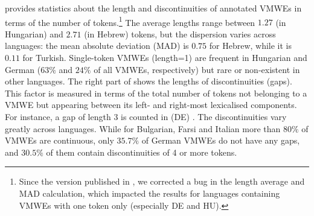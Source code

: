 \documentclass[output=paper,modfonts]{langscibook}
\begin{document}
 provides statistics about the length and discontinuities of annotated VMWEs in terms of the number of tokens.\footnote{Since the version published in \citet{MWEWorkshop}, we corrected a bug in the length average and MAD calculation, which impacted the results for languages containing VMWEs with one token only (especially DE and HU).} %
The average lengths range between 
$1.27$ (in Hungarian) and $2.71$ (in Hebrew) tokens, 
but the dispersion varies across languages: the mean absolute deviation (MAD) is $0.75$ for Hebrew, while it is $0.11$ for Turkish. Single-token VMWEs (length=1) are frequent in Hungarian and German ($63\%$ and $24\%$ %
of all VMWEs, respectively) but rare or non-existent in other languages. %
The right part of  shows the lengths of discontinuities (gaps). This factor is measured in terms of the total number of tokens not belonging to a VMWE but appearing between its left- and  right-most lexicalised components. For instance, a gap of length 3 is counted in (DE) . 
The discontinuities vary greatly across languages. While for Bulgarian, Farsi and Italian more than $80\%$ of VMWEs are continuous, only $35.7\%$ of German VMWEs do not have any gaps, and $30.5\%$ of them contain discontinuities of 4 or more tokens.
\end{document}
